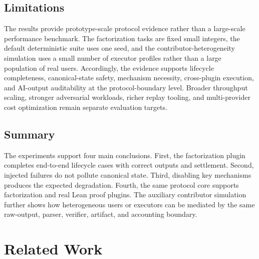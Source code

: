 \documentclass{article}
\theoremstyle{plain}
\begin{document}
\FloatBarrier

\subsection{Limitations}
\label{subsec:limitations}

The results provide prototype-scale protocol evidence rather than a large-scale
performance benchmark. The factorization tasks are fixed small integers, the
default deterministic suite uses one seed, and the contributor-heterogeneity
simulation uses a small number of executor profiles rather than a large
population of real users. Accordingly, the evidence supports lifecycle
completeness, canonical-state safety, mechanism necessity, cross-plugin
execution, and AI-output auditability at the protocol-boundary level. Broader
throughput scaling, stronger adversarial workloads, richer replay tooling, and
multi-provider cost optimization remain separate evaluation targets.

\subsection{Summary}
\label{subsec:experiment-summary}

The experiments support four main conclusions. First, the factorization plugin
completes end-to-end lifecycle cases with correct outputs and settlement.
Second, injected failures do not pollute canonical state. Third, disabling key
mechanisms produces the expected degradation. Fourth, the same protocol core
supports factorization and real Lean proof plugins. The auxiliary contributor
simulation further shows how heterogeneous users or executors can be mediated by
the same raw-output, parser, verifier, artifact, and accounting boundary.

\makeatletter
\let\@makecaption\TSoldmakecaption
\makeatother
\endgroup
\normalcolor



\section{Related Work}
\end{document}
